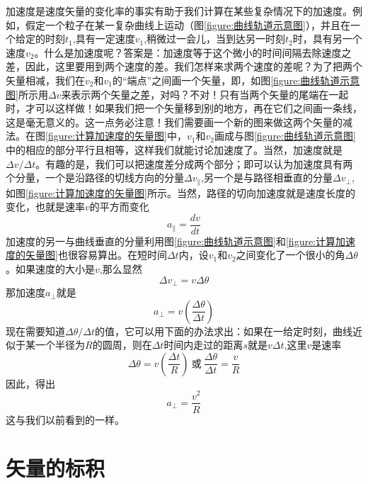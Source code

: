 加速度是速度矢量的变化率的事实有助于我们计算在某些复杂情况下的加速度。例如，假定一个粒子在某一复杂曲线上运动（图\ref{figure:曲线轨道示意图}），并且在一个给定的时刻$t_1$,具有一定速度$v_1$,稍微过一会儿，当到达另一时刻$t_2$时，具有另一个速度$v_2$。什么是加速度呢？答案是：加速度等于这个微小的时间间隔去除速度之差，因此，这里要用到两个速度的差。我们怎样来求两个速度的差呢？为了把两个矢量相减，我们在$v_2$和$v_1$的“端点”之间画一个矢量，即，如图\ref{figure:曲线轨道示意图}所示用$\Delta v$来表示两个矢量之差，对吗？不对！只有当两个矢量的尾端在一起时，才可以这样做！如果我们把一个矢量移到别的地方，再在它们之间画一条线，这是毫无意义的。这一点务必注意！我们需要画一个新的图来做这两个矢量的减法。在图\ref{figure:计算加速度的矢量图}中，$v_1$和$v_2$画成与图\ref{figure:曲线轨道示意图}中的相应的部分平行且相等，这样我们就能讨论加速度了。当然，加速度就是$\Delta v/\Delta t$。有趣的是，我们可以把速度差分成两个部分；即可以认为加速度具有两个分量，一个是沿路径的切线方向的分量$\Delta v_{\parallel}$,另一个是与路径相垂直的分量$\Delta v_{\bot}$,如图\ref{figure:计算加速度的矢量图}所示。当然，路径的切向加速度就是速度长度的变化，也就是速率$v$的平方而变化
\begin{equation}
    \label{Eq:I:11:15}
    a_{\parallel}=\frac{dv}{dt}
\end{equation}
加速度的另一与曲线垂直的分量利用图\ref{figure:曲线轨道示意图}和\ref{figure:计算加速度的矢量图}也很容易算出。在短时间$\Delta t$内，设$v_1$和$v_2$之间变化了一个很小的角$\Delta \theta$。如果速度的大小是$v$,那么显然
\begin{equation*}
    \Delta v_{\bot}=v \Delta \theta
\end{equation*}
那加速度$a_{\bot}$就是
\begin{equation*}
    a_{\bot}=v(\frac{\Delta \theta}{\Delta t})
\end{equation*}
现在需要知道$\Delta \theta/\Delta t$的值，它可以用下面的办法求出：如果在一给定时刻，曲线近似于某一个半径为$R$的圆周，则在$\Delta t$时间内走过的距离$s$就是$v \Delta t$,这里$v$是速率
\begin{equation*}
    \Delta \theta =v(\frac{\Delta t}{R})~\text{或}~\frac{\Delta \theta}{\Delta t}=\frac{v}{R}
\end{equation*}
因此，得出
\begin{equation}
    \label{Eq:I:11:16}
    a_{\bot}=\frac{v^2}{R}
\end{equation}
这与我们以前看到的一样。

\section{矢量的标积}

